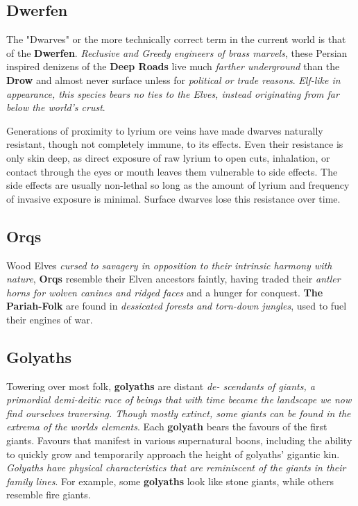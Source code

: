 \subsection{Dwerfen}
The "Dwarves" or the more technically correct term in the current world is that of the \textbf{Dwerfen}. \textit{Reclusive and Greedy engineers of brass marvels}, these Persian inspired denizens of the \textbf{Deep Roads} live much \textit{farther underground} than the \textbf{Drow} and almost never surface unless for \textit{political or trade reasons}. \textit{Elf-like in appearance, this species bears no ties to the Elves, instead originating from far below the world's crust}.

Generations of proximity to lyrium ore veins have made dwarves naturally resistant, though not completely immune, to its effects. Even their resistance is only skin deep, as direct exposure of raw lyrium to open cuts, inhalation, or contact through the eyes or mouth leaves them vulnerable to side effects. The side effects are usually non-lethal so long as the amount of lyrium and frequency of invasive exposure is minimal. Surface dwarves lose this resistance over time.

\subsection{Orqs}
Wood Elves \textit{cursed to savagery in opposition to their intrinsic harmony with nature}, \textbf{Orqs} resemble their Elven ancestors faintly, having traded their \textit{antler horns for wolven canines and ridged faces} and a hunger for conquest.\textbf{ The Pariah-Folk} are found in \textit{dessicated forests and torn-down jungles}, used to fuel their engines of war.

\subsection{Golyaths}
Towering over most folk, \textbf{golyaths} are distant \textit{de-
scendants
of
giants, a primordial demi-deitic race of beings that with time became the landscape we now find ourselves traversing. Though mostly extinct, some giants can be found in the extrema of the worlds elements}. Each \textbf{golyath} bears the favours
of
the first
giants. Favours that
manifest in various
supernatural boons, including the ability to quickly
grow and temporarily approach the height
of
golyaths' gigantic kin.
\textit{Golyaths have physical characteristics that are
reminiscent
of
the giants in their family lines}. For
example, some \textbf{golyaths} look like stone giants, while
others resemble fire giants.

